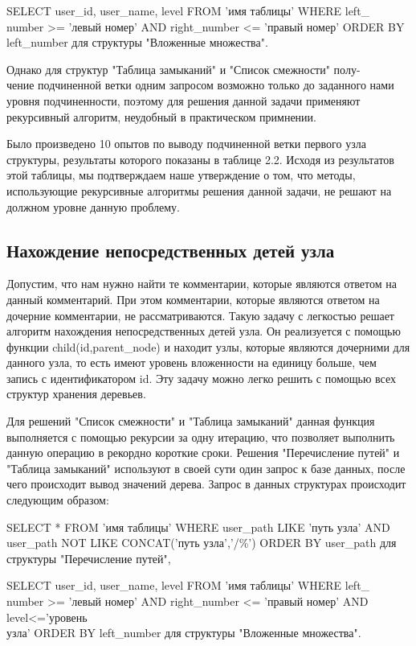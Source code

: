 \documentclass[a4paper,14pt]{extreport}
\theoremstyle{definition}
\begin{document}
SELECT user\_id, user\_name, level FROM 'имя таблицы' WHERE left\_\\number >= 'левый номер' AND right\_number <= 'правый номер' ORDER BY left\_number для структуры "Вложенные множества".


Однако для структур "Таблица замыканий" и "Список смежности" полу-\\чение подчиненной ветки одним запросом возможно только до заданного нами уровня подчиненности, поэтому для решения данной задачи применяют рекурсивный алгоритм, неудобный в практическом примнении.

Было произведено 10 опытов по выводу подчиненной ветки первого узла структуры, результаты которого показаны в таблице 2.2. Исходя из результатов этой таблицы, мы подтверждаем наше утверждение о том, что методы, использующие рекурсивные алгоритмы решения данной задачи, не решают на должном уровне данную проблему.
\subsection{Нахождение непосредственных детей узла}
Допустим, что нам нужно найти те комментарии, которые являются ответом на данный комментарий. При этом комментарии, которые являются ответом на дочерние комментарии, не рассматриваются. Такую задачу с легкостью решает алгоритм нахождения непосредственных детей узла. Он реализуется с помощью функции child(\textdollar id,\textdollar parent\_node) и находит узлы, которые являются дочерними для данного узла, то есть имеют уровень вложенности на единицу больше, чем запись с идентификатором \textdollar id. 
Эту задачу можно легко решить с помощью всех структур хранения деревьев.

Для решений "Список смежности" и "Таблица замыканий" данная функция выполняется с помощью рекурсии за одну итерацию, что позволяет выполнить данную операцию в рекордно короткие сроки. Решения "Перечисление путей" и "Таблица замыканий" используют в своей сути один запрос к базе данных, после чего происходит вывод значений дерева. Запрос в данных структурах происходит следующим образом:

SELECT * FROM 'имя таблицы' WHERE user\_path LIKE 'путь узла' AND user\_path NOT LIKE
CONCAT('путь узла','/\%') ORDER BY user\_path для структуры "Перечисление путей",

SELECT user\_id, user\_name, level FROM 'имя таблицы' WHERE left\_\\number >= 'левый номер' AND right\_number <= 'правый номер' AND level<='уровень \\узла' ORDER BY left\_number для структуры "Вложенные множества".
\end{document}

